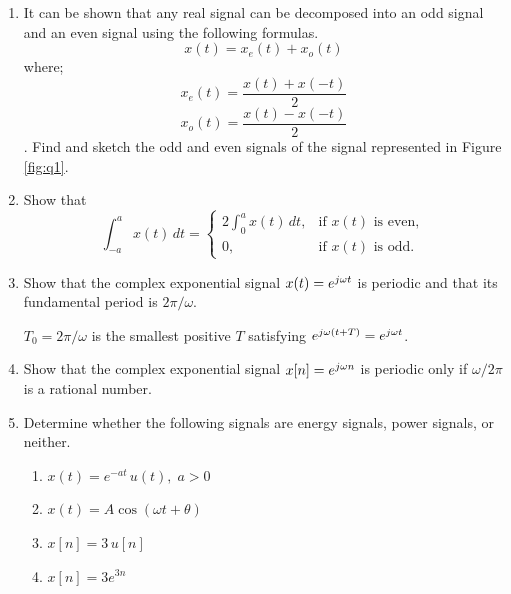 \documentclass[12pt]{article}
\begin{document}
\begin{enumerate}
\item It can be shown that any real signal can be decomposed into an odd signal and an even signal using the following formulas.
\[x(t)=x_e(t)+x_o(t)\]
where;
\[x_e(t)=\frac{x(t)+x(-t)}{2}\]
\[x_o(t)=\frac{x(t)-x(-t)}{2}\].
Find and sketch the odd and even signals of the signal represented in Figure \ref{fig:q1}.

\item Show that
\[
\int_{-a}^{a} x(t)\,dt =
\begin{cases}
2\displaystyle\int_{0}^{a} x(t)\,dt, & \text{if } x(t) \text{ is even}, \\[1em]
0, & \text{if } x(t) \text{ is odd}.
\end{cases}
\]

\item Show that the complex exponential signal $x(t) = e^{j\omega t}$ is periodic and that its fundamental period is $2\pi/\omega$.

\begin{keyresult}
$T_0 = 2\pi/\omega$ is the smallest positive $T$ satisfying $e^{j\omega(t+T)} = e^{j\omega t}$.
\end{keyresult}

\item Show that the complex exponential signal $x[n] = e^{j\omega n}$ is periodic only if $\omega/2\pi$ is a rational number.

\item Determine whether the following signals are energy signals, power signals, or neither.
\begin{enumerate}
    \item $x(t) = e^{-at}\,u(t), \; a>0$
    \item $x(t) = A\cos(\omega t + \theta)$
    \item $x[n] = 3\,u[n]$
    \item $x[n] = 3e^{3n}$
\end{enumerate}

\end{enumerate}
\end{document}
